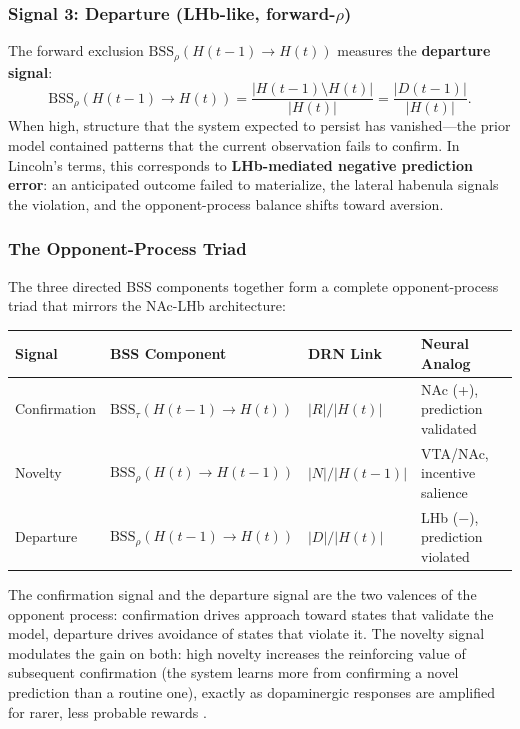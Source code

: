 \documentclass[11pt,a4paper]{article}
\theoremstyle{remark}
\begin{document}
\subsubsection*{Signal 3: Departure (LHb-like, forward-$\rho$)}

The forward exclusion $\text{BSS}_{\rho}(H(t-1) \to H(t))$ measures the
\textbf{departure signal}:
\begin{equation}
  \text{BSS}_{\rho}(H(t-1) \to H(t)) = \frac{|H(t-1) \setminus H(t)|}{|H(t)|}
  = \frac{|D(t-1)|}{|H(t)|}.
\end{equation}
When high, structure that the system expected to persist has vanished---the
prior model contained patterns that the current observation fails to confirm.
In Lincoln's terms, this corresponds to \textbf{LHb-mediated negative
prediction error}: an anticipated outcome failed to materialize, the lateral
habenula signals the violation, and the opponent-process balance shifts toward
aversion.

\subsubsection*{The Opponent-Process Triad}

The three directed BSS components together form a complete opponent-process
triad that mirrors the NAc-LHb architecture:

\begin{center}
\begin{tabular}{@{}llll@{}}
\toprule
\textbf{Signal} & \textbf{BSS Component} & \textbf{DRN Link} & \textbf{Neural Analog} \\
\midrule
Confirmation & $\text{BSS}_{\tau}(H(t-1) \to H(t))$ & $|R|/|H(t)|$ & NAc (+), prediction validated \\
Novelty       & $\text{BSS}_{\rho}(H(t) \to H(t-1))$ & $|N|/|H(t-1)|$ & VTA/NAc, incentive salience \\
Departure     & $\text{BSS}_{\rho}(H(t-1) \to H(t))$ & $|D|/|H(t)|$ & LHb ($-$), prediction violated \\
\bottomrule
\end{tabular}
\end{center}

The confirmation signal and the departure signal are the two valences of the
opponent process: confirmation drives approach toward states that validate the
model, departure drives avoidance of states that violate it. The novelty signal
modulates the gain on both: high novelty increases the reinforcing value of
subsequent confirmation (the system learns more from confirming a novel
prediction than a routine one), exactly as dopaminergic responses are amplified
for rarer, less probable rewards \cite{lincoln2026}.
\end{document}

